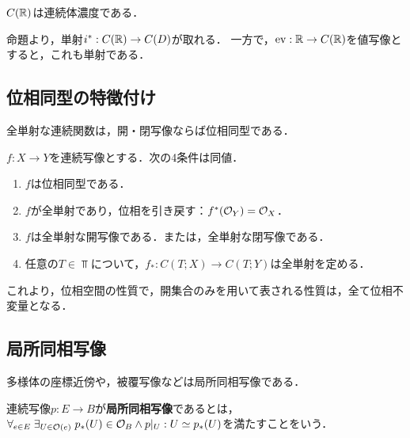 \documentclass[uplatex,dvipdfmx]{jsreport}
\begin{document}
\begin{corollary}
    $C(\mathbb{R})$は連続体濃度である．
\end{corollary}
\begin{Proof}
    命題より，単射$i^*:C(\mathbb{R})\to C(D)$が取れる．
    一方で，$\mathrm{ev}:\mathbb{R}\to C(\mathbb{R})$を値写像とすると，これも単射である．
\end{Proof}

\subsection{位相同型の特徴付け}

\begin{tcolorbox}[colframe=ForestGreen, colback=ForestGreen!10!white,breakable,colbacktitle=ForestGreen!40!white,coltitle=black,fonttitle=\bfseries\sffamily,
title=]
    全単射な連続関数は，開・閉写像ならば位相同型である．
\end{tcolorbox}

\begin{proposition}
    $f:X\to Y$を連続写像とする．次の4条件は同値．
    \begin{enumerate}
        \item $f$は位相同型である．
        \item $f$が全単射であり，位相を引き戻す：$f^*(\mathcal{O}_Y)=\mathcal{O}_X$．
        \item $f$は全単射な開写像である．または，全単射な閉写像である．
        \item 任意の$T\in\Top$について，$f_*:C(T;X)\to C(T;Y)$は全単射を定める．
    \end{enumerate}
\end{proposition}
\begin{remarks}
    これより，位相空間の性質で，開集合のみを用いて表される性質は，全て位相不変量となる．
\end{remarks}

\subsection{局所同相写像}

\begin{tcolorbox}[colframe=ForestGreen, colback=ForestGreen!10!white,breakable,colbacktitle=ForestGreen!40!white,coltitle=black,fonttitle=\bfseries\sffamily,
title=]
    多様体の座標近傍や，被覆写像などは局所同相写像である．
\end{tcolorbox}

\begin{definition}
    連続写像$p:E\to B$が\textbf{局所同相写像}であるとは，
    $\forall_{e\in E}\;\exists_{U\in\mathcal{O}(e)}\;p_*(U)\in\mathcal{O}_B\land p|_U:U\simeq p_*(U)$を満たすことをいう．
\end{definition}
\end{document}
